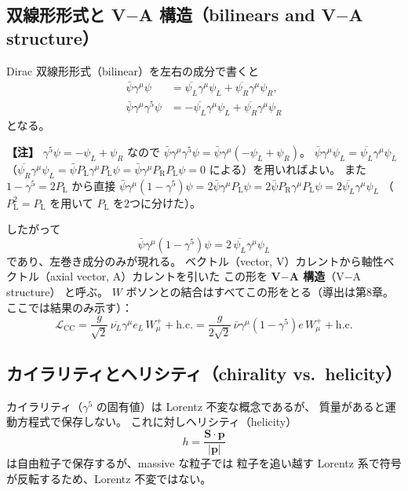 \documentclass[uplatex,dvipdfmx,a4paper,11pt,openany]{jsbook}
\newcommand{\term}[2]{\textbf{#1}（#2）}
\newcommand{\en}[1]{（#1）}
\newenvironment{note}{\vspace{1ex}\par\footnotesize\noindent\textbf{【注】}}{\par\vspace{1ex}}
\numberwithin{equation}{chapter}
\theoremstyle{definition}
\theoremstyle{plain}
\theoremstyle{remark}
\newcommand{\Lag}{\mathcal{L}}
\newcommand{\hc}{\mathrm{h.c.}}
\newcommand{\PL}{P_{\mathrm{L}}}
\newcommand{\PR}{P_{\mathrm{R}}}
\begin{document}
\subsection{双線形形式と V$-$A 構造（bilinears and V$-$A structure）}
Dirac 双線形形式\en{bilinear}を左右の成分で書くと
\begin{align}
\bar\psi\gamma^\mu\psi&=\overline{\psi_L}\gamma^\mu\psi_L+\overline{\psi_R}\gamma^\mu\psi_R,\\
\bar\psi\gamma^\mu\gamma^5\psi&=-\overline{\psi_L}\gamma^\mu\psi_L+\overline{\psi_R}\gamma^\mu\psi_R
\end{align}
となる。
\begin{note}
$\gamma^5\psi=-\psi_L+\psi_R$ なので
$\bar\psi\gamma^\mu\gamma^5\psi=\bar\psi\gamma^\mu(-\psi_L+\psi_R)$。
$\bar\psi\gamma^\mu\psi_L=\overline{\psi_L}\gamma^\mu\psi_L$
（$\overline{\psi_R}\gamma^\mu\psi_L=\bar\psi\PL\gamma^\mu\PL\psi=\bar\psi\gamma^\mu\PR\PL\psi=0$ による）を用いればよい。
また $1-\gamma^5=2\PL$ から直接
$\bar\psi\gamma^\mu(1-\gamma^5)\psi=2\bar\psi\gamma^\mu\PL\psi=2\bar\psi\PR\gamma^\mu\PL\psi=2\overline{\psi_L}\gamma^\mu\psi_L$
（$\PL^2=\PL$ を用いて $\PL$ を2つに分けた）。
\end{note}
したがって
\begin{equation}
\bar\psi\gamma^\mu(1-\gamma^5)\psi=2\,\overline{\psi_L}\gamma^\mu\psi_L
\end{equation}
であり、左巻き成分のみが現れる。
ベクトル（vector, V）カレントから軸性ベクトル（axial vector, A）カレントを引いた
この形を \term{V$-$A 構造}{V$-$A structure} と呼ぶ。
$W$ ボソンとの結合はすべてこの形をとる（導出は第8章。ここでは結果のみ示す）：
\begin{equation}
\Lag_{\mathrm{CC}}=\frac{g}{\sqrt2}\,
\overline{\nu_L}\gamma^\mu e_L\,W_\mu^++\hc
=\frac{g}{2\sqrt2}\,
\bar\nu\gamma^\mu(1-\gamma^5)e\,W_\mu^++\hc
\end{equation}
\subsection{カイラリティとヘリシティ（chirality vs.\ helicity）}
カイラリティ（$\gamma^5$ の固有値）は Lorentz 不変な概念であるが、
質量があると運動方程式で保存しない。
これに対しヘリシティ\en{helicity}
\begin{equation}
h=\frac{\bm{S}\cdot\bm{p}}{|\bm{p}|}
\end{equation}
は自由粒子で保存するが、massive な粒子では
粒子を追い越す Lorentz 系で符号が反転するため、Lorentz 不変ではない。
\end{document}
